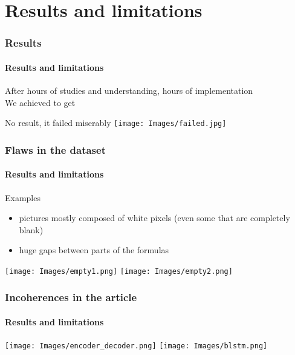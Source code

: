 \documentclass{beamer}
\begin{document}

\section{Results and limitations}

\begin{frame}
    \frametitle{Results}
    \framesubtitle{\hfill Results and limitations}
    
    After hours of studies and understanding\pause, hours of implementation\pause\\
    We achieved to get\pause
    
    \Huge{No result, it failed miserably}
    \centering
    \texttt{[image: Images/failed.jpg]}
    
\end{frame}

\begin{frame}
    \frametitle{Flaws in the dataset}
    \framesubtitle{\hfill Results and limitations}
    
    \begin{block}{Examples}
    \begin{itemize}[label=$\bullet$]
        \item pictures mostly composed of white pixels (even some that are completely blank)
        \item huge gaps between parts of the formulas
    \end{itemize}
    \end{block}
    
    \begin{exampleblock}{}
    \begin{center}
        \texttt{[image: Images/empty1.png]} \quad \texttt{[image: Images/empty2.png]}
    \end{center}
    \end{exampleblock}
    
\end{frame}

\begin{frame}
    \frametitle{Incoherences in the article}
    \framesubtitle{\hfill Results and limitations}
    
    \begin{center}
        \texttt{[image: Images/encoder\_decoder.png]}
        \texttt{[image: Images/blstm.png]}
    \end{center}
    
\end{frame}
\end{document}
